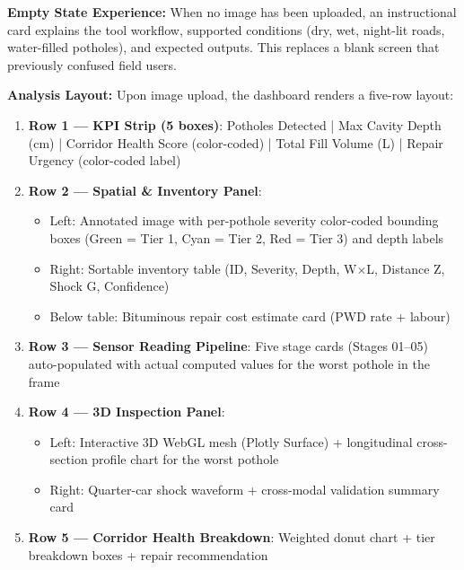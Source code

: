 \textbf{Empty State Experience:} When no image has been uploaded, an instructional card explains the tool workflow, supported conditions (dry, wet, night-lit roads, water-filled potholes), and expected outputs. This replaces a blank screen that previously confused field users.

\textbf{Analysis Layout:} Upon image upload, the dashboard renders a five-row layout:

\begin{enumerate}
    \item \textbf{Row 1 --- KPI Strip (5 boxes)}: Potholes Detected | Max Cavity Depth (cm) | Corridor Health Score (color-coded) | Total Fill Volume (L) | Repair Urgency (color-coded label)

    \item \textbf{Row 2 --- Spatial \& Inventory Panel}:
    \begin{itemize}
        \item Left: Annotated image with per-pothole severity color-coded bounding boxes (Green = Tier 1, Cyan = Tier 2, Red = Tier 3) and depth labels
        \item Right: Sortable inventory table (ID, Severity, Depth, W$\times$L, Distance Z, Shock G, Confidence)
        \item Below table: Bituminous repair cost estimate card (PWD rate + labour)
    \end{itemize}

    \item \textbf{Row 3 --- Sensor Reading Pipeline}: Five stage cards (Stages 01--05) auto-populated with actual computed values for the worst pothole in the frame

    \item \textbf{Row 4 --- 3D Inspection Panel}:
    \begin{itemize}
        \item Left: Interactive 3D WebGL mesh (Plotly Surface) + longitudinal cross-section profile chart for the worst pothole
        \item Right: Quarter-car shock waveform + cross-modal validation summary card
    \end{itemize}

    \item \textbf{Row 5 --- Corridor Health Breakdown}: Weighted donut chart + tier breakdown boxes + repair recommendation
\end{enumerate}

